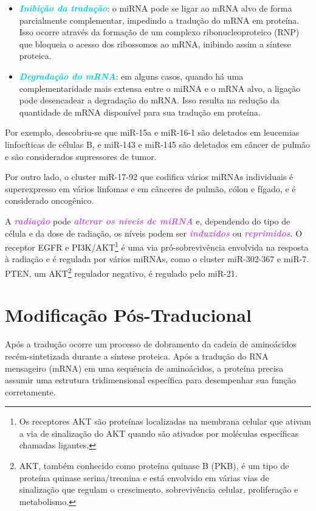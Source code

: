 \documentclass[11pt,a4paper]{article}
\newcounter{exemplo}
\begin{document}
		\begin{itemize}
			\item \textcolor{DarkTurquoise}{\textbf{\textit{Inibição da tradução}}}: o miRNA pode se ligar ao mRNA alvo de forma parcialmente complementar, impedindo a tradução do mRNA em proteína. Isso ocorre através da formação de um complexo ribonucleoproteico (RNP) que bloqueia o acesso dos ribossomos ao mRNA, inibindo assim a síntese proteica.
			\item \textcolor{DarkTurquoise}{\textbf{\textit{Degradação do mRNA}}}: em alguns casos, quando há uma complementaridade mais extensa entre o miRNA e o mRNA alvo, a ligação pode desencadear a degradação do mRNA. Isso resulta na redução da quantidade de mRNA disponível para sua tradução em proteína.
		\end{itemize}

	Por exemplo, descobriu-se que miR-15a e miR-16-1 são deletados em leucemias linfocíticas de células B, e miR-143 e miR-145 são deletados em câncer de pulmão e são considerados supressores de tumor. 
		
	Por outro lado, o cluster miR-17-92 que codifica vários miRNAs individuais é superexpresso em vários linfomas e em cânceres de pulmão, cólon e fígado, e é considerado oncogênico.
		
	A \textcolor{MediumOrchid}{\textbf{\textit{radiação}}} pode \textcolor{MediumOrchid}{\textbf{\textit{alterar os níveis de miRNA}}} e, dependendo do tipo de célula e da dose de radiação, os níveis podem ser \textcolor{MediumOrchid}{\textbf{\textit{induzidos}}} ou \textcolor{MediumOrchid}{\textbf{\textit{reprimidos}}}. O receptor EGFR e PI3K/AKT\footnote{Os receptores AKT são proteínas localizadas na membrana celular que ativam a via de sinalização do AKT quando são ativados por moléculas específicas chamadas ligantes.} é uma via pró-sobrevivência envolvida na resposta à radiação e é regulada por vários miRNAs, como o cluster miR-302-367 e miR-7. PTEN, um AKT\footnote{AKT, também conhecido como proteína quinase B (PKB), é um tipo de proteína quinase serina/treonina e está envolvido em várias vias de sinalização que regulam o crescimento, sobrevivência celular, proliferação e metabolismo.} regulador negativo, é regulado pelo miR-21.

\section{Modificação Pós-Traducional}

	Após a tradução ocorre um processo de dobramento da cadeia de aminoácidos recém-sintetizada durante a síntese proteica. Após a tradução do RNA mensageiro (mRNA) em uma sequência de aminoácidos, a proteína precisa assumir uma estrutura tridimensional específica para desempenhar sua função corretamente.
\end{document}
